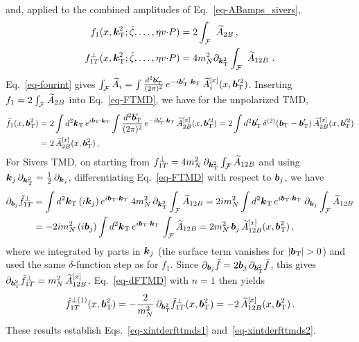 \begin{widetext}
\begin{align}
\end{align}
and, applied to the combined amplitudes of Eq.~\eqref{eq-ABamps_sivers},
\begin{align}
	f_1(x,\boldsymbol{k}_{\mathrm T}^2;{\hat \zeta},\ldots,\eta v {\cdot} P) & = 2 \int_\mathcal{F}\ \widetilde{A}_{2B} \,,\nonumber \\
	f_{1T}^\perp(x,\boldsymbol{k}_{\mathrm T}^2;{\hat \zeta},\ldots,\eta v {\cdot} P) & =  4 m_N^2 \partial_{\boldsymbol{k}_{\mathrm T}^2} \int_\mathcal{F}\ \widetilde{A}_{12B} \ .
	\label{eq-tmdsfromampsodd}
\end{align}
Eq.~\eqref{eq-fourint} gives $\int_\mathcal{F} \widetilde{A}_i = \int \frac{d^2 \boldsymbol{b}_{\mathrm T}'}{(2\pi)^2}\, e^{-i\boldsymbol{b}_{\mathrm T}'{\cdot}\boldsymbol{k}_{\mathrm T}}\, \widetilde{A}^{[x]}_i(x,\boldsymbol{b}_{\mathrm T}'^2)$. Inserting $f_1 = 2\int_\mathcal{F}\widetilde{A}_{2B}$ into Eq.~\eqref{eq-FTMD}, we have for the unpolarized TMD,
\begin{align}
	\tilde f_1(x,\boldsymbol{b}_{\mathrm T}^2) 
	&= 2 \int d^2\boldsymbol{k}_{\mathrm T}\, e^{i\boldsymbol{b}_{\mathrm T}{\cdot}\boldsymbol{k}_{\mathrm T}} \int \frac{d^2 \boldsymbol{b}_{\mathrm T}'}{(2\pi)^2}\, e^{-i\boldsymbol{b}_{\mathrm T}'{\cdot}\boldsymbol{k}_{\mathrm T}}\, \widetilde{A}^{[x]}_{2B}(x,\boldsymbol{b}_{\mathrm T}'^2) 
	= 2 \int d^2 \boldsymbol{b}_{\mathrm T}'\, \delta^{(2)}(\boldsymbol{b}_{\mathrm T}-\boldsymbol{b}_{\mathrm T}')\, \widetilde{A}^{[x]}_{2B}(x,\boldsymbol{b}_{\mathrm T}'^2) \nonumber\\
	&= 2\, \widetilde{A}^{[x]}_{2B}(x,\boldsymbol{b}_{\mathrm T}^2)\,,
\end{align}
For Sivers TMD, on starting from $f_{1T}^\perp = 4m_N^2\,\partial_{\boldsymbol{k}_{\mathrm T}^2}\int_\mathcal{F}\widetilde{A}_{12B}$ and using $\boldsymbol{k}_j\,\partial_{\boldsymbol{k}_{\mathrm T}^2} = \tfrac12\,\partial_{\boldsymbol{k}_j}$, differentiating Eq.~\eqref{eq-FTMD} with respect to $\boldsymbol{b}_j$, we have
\begin{align}
	\partial_{\boldsymbol{b}_j}\tilde f_{1T}^\perp 
	&= \int d^2\boldsymbol{k}_{\mathrm T}\,(i\boldsymbol{k}_j)\,e^{i\boldsymbol{b}_{\mathrm T}{\cdot}\boldsymbol{k}_{\mathrm T}}\; 4m_N^2\,\partial_{\boldsymbol{k}_{\mathrm T}^2}\int_\mathcal{F}\widetilde{A}_{12B}
	 = 2im_N^2 \int d^2\boldsymbol{k}_{\mathrm T}\, e^{i\boldsymbol{b}_{\mathrm T}{\cdot}\boldsymbol{k}_{\mathrm T}}\;\partial_{\boldsymbol{k}_j}\int_\mathcal{F}\widetilde{A}_{12B} \nonumber\\
	&= -2im_N^2\,(i\boldsymbol{b}_j) \int d^2\boldsymbol{k}_{\mathrm T}\, e^{i\boldsymbol{b}_{\mathrm T}{\cdot}\boldsymbol{k}_{\mathrm T}}\,\int_\mathcal{F}\widetilde{A}_{12B}
	 = 2m_N^2\,\boldsymbol{b}_j\,\widetilde{A}^{[x]}_{12B}(x,\boldsymbol{b}_{\mathrm T}^2)\,,
\end{align}
where we integrated by parts in $\boldsymbol{k}_j$ (the surface term vanishes for $|\vprp{\bvec}|>0$) and used the same $\delta$-function step as for $f_1$. Since $\partial_{\boldsymbol{b}_j}\tilde f = 2\boldsymbol{b}_j\,\partial_{\boldsymbol{b}_{\mathrm T}^2}\tilde f$, this gives $\partial_{\boldsymbol{b}_{\mathrm T}^2}\tilde f_{1T}^\perp = m_N^2\,\widetilde{A}^{[x]}_{12B}$. Eq.~\eqref{eq-dFTMD} with $n=1$ then yields
\begin{equation}
	\tilde f_{1T}^{\perp(1)}(x,\boldsymbol{b}_{\mathrm T}^2) = -\frac{2}{m_N^2}\,\partial_{\boldsymbol{b}_{\mathrm T}^2}\tilde f_{1T}^\perp(x,\boldsymbol{b}_{\mathrm T}^2) = -2\,\widetilde{A}^{[x]}_{12B}(x,\boldsymbol{b}_{\mathrm T}^2)\,.
\end{equation}
These results establish Eqs.~\eqref{eq-xintderfttmds1} and~\eqref{eq-xintderfttmds2}.
\end{widetext}
